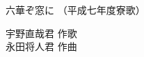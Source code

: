 \documentclass[10pt,b5j]{tarticle} %
\begin{document}
\begin{minipage}[c]{0.7\hsize} %
    \begin{center}
        {\LARGE
            六華ぞ窓に %
        }
        {\small 
            （平成七年度寮歌） %
        }
    \end{center}
\end{minipage}
\begin{minipage}[c]{0.3\hsize} %
    \begin{flushright} %
        宇野直哉君 作歌\\永田将人君 作曲 %
    \end{flushright}
\end{minipage}
\end{document}
